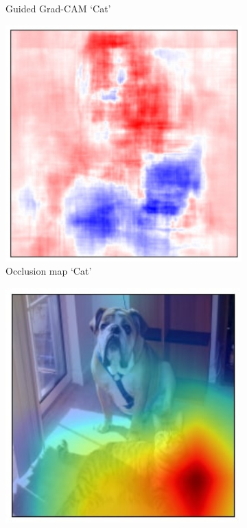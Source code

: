 \begin{figure}[t!]
\begin{subfigure}[t]{0.161\textwidth}
        \caption{\hspace{-1.5pt}\scriptsize{Guided Grad-CAM `Cat'}}
        \label{fig:teaser_gbgcam_cat}
	\end{subfigure}
	\begin{subfigure}[t]{0.161\textwidth}
		\centering
		\includegraphics[width=\textwidth]{figures/teaser/occlusion.jpg}
        \caption{\scriptsize{Occlusion map `Cat'}}
        \label{fig:teaser_cat_occlusion}
	\end{subfigure}
	\begin{subfigure}[t]{0.161\textwidth}
		\centering
		\includegraphics[width=0.995\textwidth]{figures/gcam_res18_283.jpg}

\end{subfigure}
\end{figure}
